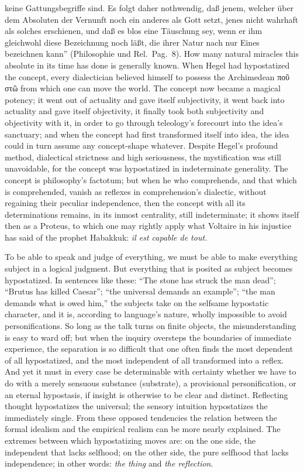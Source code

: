 \documentclass[12pt]{book}
\begin{document}
keine Gattungsbegriffe sind. Es folgt daher nothwendig, daß jenem, welcher
über dem Absoluten der Vernunft noch ein anderes als Gott setzt, jenes nicht
wahrhaft als solches erschienen, und daß es blos eine Täuschung sey, wenn er
ihm gleichwohl diese Bezeichnung noch läßt, die ihrer Natur nach nur Eines
bezeichnen kann'' (Philosophie und Rel.\ Pag.\ 8). How many natural miracles
this absolute in its time has done is generally known. When Hegel had
hypostatized the concept, every dialectician believed himself to possess the
Archimedean ποῦ στῶ from which one can move the world. The concept now
became a magical potency; it went out of actuality and gave itself
subjectivity, it went back into actuality and gave itself objectivity, it
finally took both subjectivity and objectivity with it, in order to go
through teleology's forecourt into the idea's sanctuary; and when the
concept had first transformed itself into idea, the idea could in turn
assume any concept-shape whatever. Despite Hegel's profound method,
dialectical strictness and high seriousness, the mystification was still
unavoidable, for the concept was hypostatized in indeterminate generality.
The concept is philosophy's factotum; but when he who comprehends, and that
which is comprehended, vanish as reflexes in comprehension's dialectic,
without regaining their peculiar independence, then the concept with all its
determinations remains, in its inmost centrality, still indeterminate; it
shows itself then as a Proteus, to which one may rightly apply what Voltaire
in his injustice has said of the prophet Habakkuk: \textit{il est capable de
tout.}

To be able to speak and judge of everything, we must be able to make
everything subject in a logical judgment. But everything that is posited as
subject becomes hypostatized. In sentences like these: ``The stone has
struck the man dead''; ``Brutus has killed Caesar''; ``the universal demands
an example''; ``the man demands what is owed him,'' the subjects take on the
selfsame hypostatic character, and it is, according to language's nature,
wholly impossible to avoid personifications. So long as the talk turns on
finite objects, the misunderstanding is easy to ward off; but when the
inquiry oversteps the boundaries of immediate experience, the separation is
so difficult that one often finds the most dependent of all hypostatized,
and the most independent of all transformed into a reflex. And yet it must
in every case be determinable with certainty whether we have to do with a
merely sensuous substance (substrate), a provisional personification, or an
eternal hypostasis, if insight is otherwise to be clear and distinct.
Reflecting thought hypostatizes the universal; the sensory intuition
hypostatizes the immediately single. From these opposed tendencies the
relation between the formal idealism and the empirical realism can be more
nearly explained. The extremes between which hypostatizing moves are: on the
one side, the independent that lacks selfhood; on the other side, the pure
selfhood that lacks independence; in other words: \emph{the thing} and
\emph{the reflection}.
\end{document}
